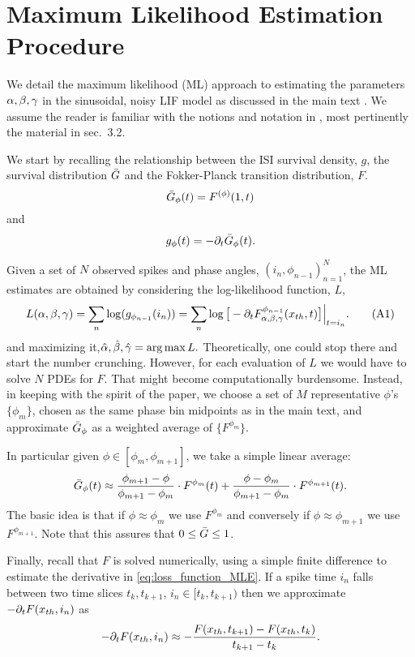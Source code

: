 \section{Maximum Likelihood Estimation Procedure}
We detail the maximum likelihood (ML) approach to estimating the parameters
${\alpha,\beta,{\gamma } }$ in the sinusoidal, noisy LIF model as discussed in the main text
\cite{Iolov2013}. We assume the reader is familiar with the notions and notation
in \cite{Iolov2013}, most pertinently the material in sec.\ 3.2.

We start by recalling the relationship between the ISI survival density, $g$,
the survival distribution ${ \bar{G} }$ and the Fokker-Planck transition distribution,
$F$. $${ \bar{G} }_{\phi}(t) = F^{(\phi)}(1,t)$$ and $$g_{\phi}( t)  = -{\partial}_t
{ \bar{G} }_{\phi}(t). $$

Given a set of $N$ observed spikes and phase angles, $(i_n,
\phi_{n-1})_{n=1}^N$, the ML estimates are obtained by considering the
log-likelihood function, $L$,
\begin{equation}
 L(\alpha,\beta,{\gamma }) = \sum_n  \log (
g_{\phi_{n-1}}(i_n) ) = \sum_n \log \big[ -{\partial}_t F^{\phi_{n-1}}_{\alpha,\beta,{\gamma }}({ x_{th} }, t) \big] \Big|_{t =
i_n}. 
\label{eq:loss_function_MLE}
\tag{A1}
\end{equation}
and maximizing it,$\abgest = \argmax L.$
Theoretically, one could stop there and start the number crunching. However, for
each evaluation of $L$ we would have to solve $N$ PDEs for $F$. That might
become computationally burdensome. Instead, in keeping with the spirit of the
paper, we choose a set of $M$ representative $\phi$'s $\{\phi_m\}$, chosen as
the same phase bin midpoints as in the main text, and approximate ${ \bar{G} }_\phi$ as
a weighted average of $\{F^{\phi_m} \}$.



In particular given $\phi \in [\phi_m, \phi_{m+1}]$, we take a simple
linear average:
$${ \bar{G} }_\phi(t) \approx
\frac{\phi_{m+1} - \phi}{\phi_{m+1} - \phi_{m}} \cdot F^{\phi_m}(t)
+ 
\frac{\phi - \phi_{m}}{\phi_{m+1} - \phi_{m}} \cdot F^{\phi_{m+1}}(t).
$$
The basic idea is that if $\phi \approx \phi_m$ we use $F^{\phi_m}$ and
conversely if $\phi \approx \phi_{m+1}$ we use $F^{\phi_{m+1}}$.
Note that this assures that $0 \leq { \bar{G} } \leq 1$.

Finally, recall that $F$ is solved numerically, using a simple finite difference
to estimate the derivative in \cref{eq:loss_function_MLE}. If a spike time $i_n$
falls between two time slices $t_k, t_{k+1}$, $i_n \in [t_k, t_{k+1})$ then we approximate $-{\partial}_t F({ x_{th} }, i_n)$ as $$ -{\partial}_t F({ x_{th} }, i_n)
\approx -\frac{F({ x_{th} }, t_{k+1}) - F({ x_{th} }, t_{k})}{t_{k+1} - t_{k}}. $$


